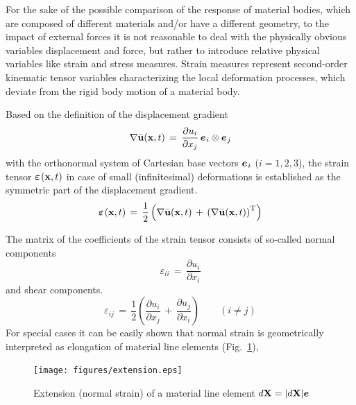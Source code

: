 For the sake of the possible comparison of the response of material bodies, which are composed of different materials and/or have a different geometry, to the impact of external forces it is not reasonable to deal with the physically obvious variables displacement and force, but rather to introduce relative physical variables like strain and stress measures. Strain measures represent second-order kinematic tensor variables characterizing the local deformation processes, which deviate from the rigid body motion of a material body.

Based on the definition of the displacement gradient
\begin{equation}
\nabla{\bar{\mathbf{u}}}(\mathbf{x},t)\,=\,\frac{\partial u_i}{\partial x_j}\,\miu{e}{i}{}\otimes\miu{e}{j}{}
\label{eq:dispgrad}
\end{equation}
with the orthonormal system of Cartesian base vectors $\mbox{${\mbox{\boldmath${e}$\unboldmath}}_{\:\!i}$}$ ($i=1,2,3$), the strain tensor $\mbox{${\mbox{\boldmath${\varepsilon}$\unboldmath}}_{\:\!}$}(\mathbf{x},t)$ in case of small (infinitesimal) deformations is established as the symmetric part of the displacement gradient.
\begin{equation}
\miu{\varepsilon}{}{}(\mathbf{x},t)\,=\,\frac{1}{2}
\left(\nabla{\bar{\mathbf{u}}}(\mathbf{x},t)\,+\,\left(\nabla{\bar{\mathbf{u}}}(\mathbf{x},t)\right)^{\mathrm{T}}\right)
\label{eq:straintens}
\end{equation}

The matrix of the coefficients of the strain tensor consists of so-called normal components
\begin{equation}
\varepsilon_{ii}\,=\,\frac{\partial u_i}{\partial x_i}
\label{eq:straintensnormal}
\end{equation}
and shear components.
\begin{equation}
\varepsilon_{ij}\,=\,
\frac{1}{2}\left(\frac{\partial u_i}{\partial x_j}\,+\,\frac{\partial u_j}{\partial x_i}\right)
\qquad(i\neq{j})
\label{eq:straintensshear}
\end{equation}
For special cases it can be easily shown that normal strain is geometrically interpreted as elongation of material line elements (Fig.~\ref{fig:extension}),
\begin{figure}[htb!]
\begin{center}
\footnotesize
\texttt{[image: figures/extension.eps]}
\caption{Extension (normal strain) of a material line element $d\mathbf{X}=\vert d\mathbf{X}\vert\mbox{${\mbox{\boldmath${e}$\unboldmath}}_{\:\!}$}$
\cite{Haupt:2002}}
\label{fig:extension}
\end{center}
\end{figure}

